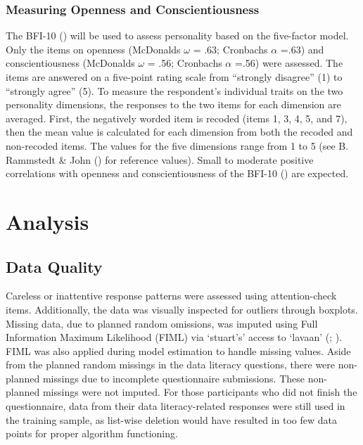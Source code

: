 \documentclass[
  12pt,
  a4paper,
  twoside]{article}
\begin{document}
\subsubsection{Measuring Openness and Conscientiousness}\label{measuring-openness-and-conscientiousness}

The BFI-10 () will be used to assess
personality based on the five-factor model. Only the items on openness (McDonalds \(\omega\) = .63; Cronbachs \(\alpha\) =.63) and conscientiousness (McDonalds \(\omega\) = .56; Cronbachs \(\alpha\) =.56) were assessed.
The items are answered on a five-point rating scale from ``strongly disagree'' (1) to
``strongly agree'' (5). To measure the respondent's individual traits on the two
personality dimensions, the responses to the two items for each dimension are
averaged. First, the negatively worded item is recoded (items 1, 3, 4, 5, and 7), then
the mean value is calculated for each dimension from both the recoded and non-recoded items. The values for the five dimensions range from 1 to 5 (see B. Rammstedt \& John () for reference values). Small to moderate positive correlations with openness and conscientiousness of the BFI-10 () are expected.

\section{Analysis}\label{analysis}

\subsection{Data Quality}\label{data-quality}

Careless or inattentive response patterns were assessed using attention-check items. Additionally, the data was visually inspected for outliers through boxplots. Missing data, due to planned random omissions, was imputed using Full Information Maximum Likelihood (FIML) via `stuart's' access to `lavaan' (; ). FIML was also applied during model estimation to handle missing values. Aside from the planned random missings in the data literacy questions, there were non-planned missings due to incomplete questionnaire submissions. These non-planned missings were not imputed. For those participants who did not finish the questionnaire, data from their data literacy-related responses were still used in the training sample, as list-wise deletion would have resulted in too few data points for proper algorithm functioning.
\end{document}
